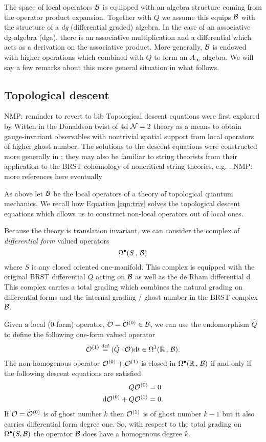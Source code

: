 \documentclass[11pt]{amsart}
\def\natalie#1{{\textcolor{green!65!black}{NMP: {#1}}}}
\begin{document}
The space of local operators $\mathcal B$ is equipped with an algebra structure coming from the operator product expansion. 
Together with $Q$ we assume this equips $\mathcal B$ with the structure of a {\em dg} (differential graded) algebra. In the case of an associative dg-algebra (dga), there is an associative multiplication and a differential which acts as a derivation on the associative product. 
More generally, $\mathcal B$ is endowed with higher operations which combined with $Q$ to form an $A_\infty$ algebra. 
We will say a few remarks about this more general situation in what follows. 

\subsection{Topological descent} 
\natalie{reminder to revert to bib}
Topological descent equations were first explored by Witten in the Donaldson twist of 4d $\mathcal N=2$ theory \cite{W88} as a means to obtain gauge-invariant observables with nontrivial spatial support from local operators of higher ghost number. The solutions to the descent equations were constructed more generally in \cite{MW97}; they may also be familiar to string theorists from their application to the BRST cohomology of noncritical string theories, e.g. \cite{WZ92}. \natalie{more references here eventually}

As above let $\mathcal B$ be the local operators of a theory of topological quantum mechanics. 
We recall how Equation \eqref{eqn:triv} solves the topological descent equations which allows us to construct non-local operators out of local ones. 

Because the theory is translation invariant, we can consider the complex of {\em differential form} valued operators
\[
\Omega^\bullet(S \, , \, \mathcal B) 
\]
where $S$ is any closed oriented one-manifold. 
This complex is equipped with the original BRST differential $Q$ acting on $\mathcal B$ as well as the de Rham differential ${\rm d}$. 
This complex carries a total grading which combines the natural grading on differential forms and the internal grading / ghost number in the BRST complex $\mathcal B$. 

Given a local (0-form) operator, $\mathcal O = \mathcal O^{(0)} \in \mathcal B$, we can use the endomorphism $\hat{Q}$ to define the following one-form valued operator
\[
\mathcal O^{(1)} \overset{\rm def}{=} (\hat{Q} \cdot \mathcal O) {\rm d} t \in \Omega^1(\mathbb R \, , \, \mathcal B).
\]
The non-homogenous operator $\mathcal O^{(0)} + \mathcal O^{(1)}$ is closed in $\Omega^\bullet(\mathbb R \, , \, \mathcal B)$ if and only if the following descent equations are satisfied 
\begin{align*}
Q \mathcal O^{(0)} & = 0 \\
{\rm d} \mathcal O^{(0)} + Q \mathcal O^{(1)} & = 0 .
\end{align*}
If $\mathcal O = \mathcal O^{(0)}$ is of ghost number $k$ then $\mathcal O^{(1)}$ is of ghost number $k-1$ but it also carries differential form degree one. 
So, with respect to the total grading on $\Omega^\bullet(S, \mathcal B)$ the operator $\mathcal B$ does have a homogenous degree $k$.
\end{document}

